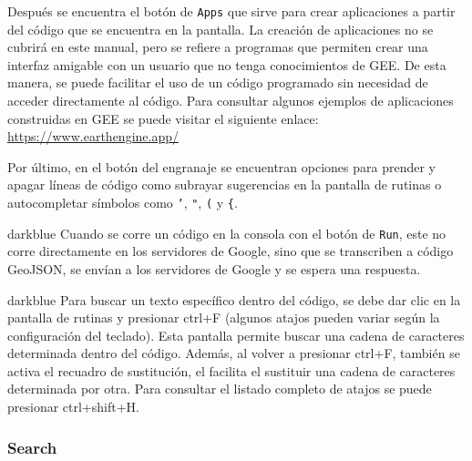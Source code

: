 \documentclass[
  12pt,
  letterpaper,
  twoside]{book}
\begin{document}
Después se encuentra el botón de \texttt{Apps} que sirve para crear aplicaciones a partir del código que se encuentra en la pantalla. La creación de aplicaciones no se cubrirá en este manual, pero se refiere a programas que permiten crear una interfaz amigable con un usuario que no tenga conocimientos de GEE. De esta manera, se puede facilitar el uso de un código programado sin necesidad de acceder directamente al código. Para consultar algunos ejemplos de aplicaciones construidas en GEE se puede visitar el siguiente enlace: \url{https://www.earthengine.app/}

Por último, en el botón del engranaje se encuentran opciones para prender y apagar líneas de código como subrayar sugerencias en la pantalla de rutinas o autocompletar símbolos como \texttt{’}, \texttt{"}, \texttt{(} y \texttt{\{}.

\begin{bluebox2}

\begin{awesomeblock}{5pt}{\faLightbulb}{darkblue}
Cuando se corre un código en la consola con el botón de \texttt{Run}, este no corre directamente en los servidores de Google, sino que se transcriben a código GeoJSON, se envían a los servidores de Google y se espera una respuesta.

\end{awesomeblock}

\end{bluebox2}

\begin{bluebox2}

\begin{awesomeblock}{5pt}{\faLightbulb}{darkblue}
Para buscar un texto específico dentro del código, se debe dar clic en la pantalla de rutinas y presionar ctrl+F (algunos atajos pueden variar según la configuración del teclado). Esta pantalla permite buscar una cadena de caracteres determinada dentro del código. Además, al volver a presionar ctrl+F, también se activa el recuadro de sustitución, el facilita el sustituir una cadena de caracteres determinada por otra. Para consultar el listado completo de atajos se puede presionar ctrl+shift+H.

\end{awesomeblock}

\end{bluebox2}

\hypertarget{search}{%
\subsubsection*{Search}\label{search}}
\end{document}
